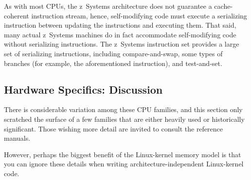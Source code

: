 As with most CPUs, the z~Systems architecture does not guarantee a
cache-coherent instruction stream, hence,
self-modifying code must execute a serializing instruction between updating
the instructions and executing them.
That said, many actual z~Systems machines do in fact accommodate self-modifying
code without serializing instructions.
The z~Systems instruction set provides a large set of serializing instructions,
including compare-and-swap, some types of branches (for example, the
aforementioned  instruction), and test-and-set.

\subsection{Hardware Specifics:
	    Discussion}
\label{sec:memorder:Hardware Specifics: Discussion}

There is considerable variation among these CPU families, and this section
only scratched the surface of a few families that are either heavily used
or historically significant.
Those wishing more detail are invited to consult the reference manuals.

However, perhaps the biggest benefit of the Linux-kernel memory model is
that you can ignore these details when writing architecture-independent
Linux-kernel code.

